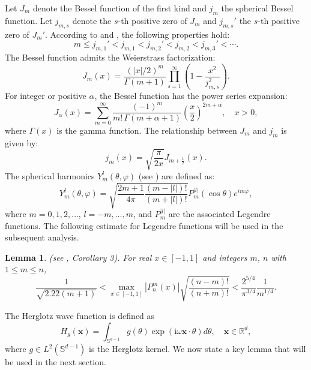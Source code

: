 \documentclass[11pt,reqno,oneside]{amsart}
\numberwithin{equation}{section}
\newtheorem{lemma}[theorem]{Lemma}
\theoremstyle{definition}
\theoremstyle{remark}
\numberwithin{equation}{section}
\begin{document}
	Let $J_m$ denote the Bessel function of the first kind and $j_m$ the spherical Bessel function. Let $j_{m,s}$ denote the $s$-th positive zero of $J_m$ and $j_{m,s}'$ the $s$-th positive zero of $J_m'$. According to \cite{Abramowitz} and \cite{LiuZou}, the following properties hold:
	\begin{equation*}
		m \leq j_{m,1}' < j_{m,1} < j_{m,2}' < j_{m,2} < j_{m,3}' < \cdots.
	\end{equation*}
	The Bessel function admits the Weierstrass factorization:
	\begin{equation*}\label{eq:bessel_factorization}
		J_m(x) = \frac{(|x|/2)^m}{\Gamma(m+1)} \prod_{s=1}^{\infty} \left(1 - \frac{x^2}{j_{m,s}^2}\right).
	\end{equation*}
	For integer or positive $\alpha$, the Bessel function has the power series expansion:
	\begin{equation}\label{eq:bessel_series}
		J_\alpha(x) = \sum_{m=0}^{\infty} \frac{(-1)^m}{m!\,\Gamma(m+\alpha+1)} \left(\frac{x}{2}\right)^{2m+\alpha}, \quad x > 0,
	\end{equation}
	where $\Gamma(x)$ is the gamma function. The relationship between $J_m$ and $j_m$ is given by:
	\begin{equation}\label{eq:bessel_spherical}
		j_m(x) = \sqrt{\frac{\pi}{2x}} J_{m+\frac{1}{2}}(x).
	\end{equation}
	The spherical harmonics $Y_m^l(\theta,\varphi)$ (see \cite[Theorem 2.8]{ColtonKress}) are defined as:
	\begin{equation}\label{eq:spherical_harmonics}
		Y_m^l(\theta, \varphi) = \sqrt{\frac{2m+1}{4\pi} \frac{(m-|l|)!}{(m+|l|)!}} P_m^{|l|}(\cos \theta) e^{i m \varphi},
	\end{equation}
	where $m = 0,1,2,\ldots$, $l = -m,\ldots,m$, and $P_m^{|l|}$ are the associated Legendre functions. The following estimate for Legendre functions will be used in the subsequent analysis.
	\begin{lemma}\label{lem:legendre_bound}
		(see \cite{Lohofer}, Corollary 3). For real $x \in [-1,1]$ and integers $m$, $n$ with $1 \leq m \leq n$,
		\begin{equation}\label{eq:legendre_bound}
			\frac{1}{\sqrt{2.22(m+1)}} < \max_{x \in [-1,1]} |P_n^m(x)| \sqrt{\frac{(n-m)!}{(n+m)!}} < \frac{2^{5/4}}{\pi^{3/4}} \frac{1}{m^{1/4}}.
		\end{equation}
	\end{lemma}
	The Herglotz wave function is defined as
	\begin{equation}\label{Herglotz}
		H_{g}(\mathbf{x})=\int_{\mathbb S^{d-1}} g(\theta) \exp(\mathrm{i} \omega \mathbf{x} \cdot \theta) d\theta, \quad \mathbf{x} \in \mathbb{R}^d,
	\end{equation}
	where $g \in L^2(\mathbb{S}^{d-1})$ is the Herglotz kernel. We now state a key lemma that will be used in the next section.
	
\end{document}
